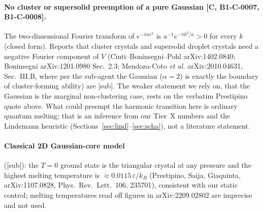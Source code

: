 \documentclass[10pt]{article}
\newcommand{\tier}[1]{\textsf{[#1]}}
\newcommand{\sub}{\textsf{[sub]}}
\begin{document}
\paragraph{No cluster or supersolid preemption of a pure Gaussian \tier{C, B1-C-0007, B1-C-0008}.} The two-dimensional Fourier transform of $e^{-\pi a r^2}$ is $a^{-1}e^{-\pi k^2/a}>0$ for every $k$ (closed form). Reports that cluster crystals and supersolid droplet crystals need a negative Fourier component of $V$ (Cinti--Boninsegni--Pohl arXiv:1402.0840; Boninsegni arXiv:1201.0980 Sec.~2.3; Mendoza-Coto \emph{et al.} arXiv:2010.04631, Sec.~III.B, where per the sub-agent the Gaussian ($\alpha=2$) is exactly the boundary of cluster-forming ability) are \sub{}. The weaker statement we rely on, that the Gaussian is the marginal non-clustering case, rests on the verbatim Prestipino quote above. What could preempt the harmonic transition here is ordinary quantum melting; that is an inference from our Tier~X numbers and the Lindemann heuristic (Sections~\ref{sec:lind}--\ref{sec:scha}), not a literature statement.
\paragraph{Classical 2D Gaussian-core model} (\sub): the $T=0$ ground state is the triangular crystal at any pressure and the highest melting temperature is $\approx0.0115\,\varepsilon/k_B$ (Prestipino, Saija, Giaquinta, arXiv:1107.0828, Phys.\ Rev.\ Lett.\ 106, 235701), consistent with our static control; melting temperatures read off figures in arXiv:2209.02802 are imprecise and not used.
\end{document}
